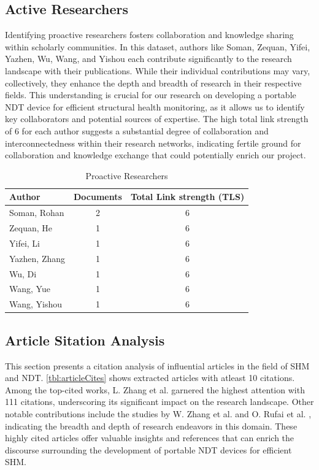 \documentclass[journal, a4paper]{IEEEtran}
\begin{document}
\subsection{Active Researchers}
Identifying proactive researchers fosters collaboration and knowledge sharing within scholarly communities.
In this dataset, authors like Soman, Zequan, Yifei, Yazhen, Wu, Wang, and Yishou each contribute
significantly to the research landscape with their publications. While their individual contributions may vary,
collectively, they enhance the depth and breadth of research in their respective fields.
This understanding is crucial for our research on developing a portable NDT device for efficient structural health monitoring,
as it allows us to identify key collaborators and potential sources of expertise.
The high total link strength of 6 for each author suggests a substantial degree of collaboration
and interconnectedness within their research networks, indicating fertile ground for collaboration
and knowledge exchange that could potentially enrich our project.

\begin{table}[htbp]

  \centering
  \caption{Proactive Researchers}
  \label{tbl:bresearchers}
  \begin{tabular}{lcc}

      \toprule
      \textbf{Author} & \textbf{Documents} & \textbf{Total Link strength (TLS)} \\
      \midrule
      Soman, Rohan & 2 & 6 \\
      Zequan, He & 1 & 6 \\
      Yifei, Li & 1 & 6 \\
      Yazhen, Zhang & 1 & 6 \\
      Wu, Di & 1 & 6 \\
      Wang, Yue & 1 & 6 \\
      Wang, Yishou & 1 & 6 \\
      \bottomrule
  \end{tabular}
\end{table}


\subsection{Article Sitation Analysis}
This section presents a citation analysis of influential articles in the field of SHM and NDT.
\autoref{tbl:articleCites} shows extracted articles with atleast 10 citations.
Among the top-cited works, L. Zhang et al. \cite{zhang_structural_2021} garnered the highest attention with 111 citations,
underscoring its significant impact on the research landscape.
Other notable contributions include the studies by W. Zhang et al. \cite{zhang_defect_2020}
and O. Rufai et al. \cite{rufai_cure_2020}, indicating the breadth and depth of research endeavors in this domain.
These highly cited articles offer valuable insights and references
that can enrich the discourse surrounding the development of portable NDT devices for efficient SHM.
\end{document}
